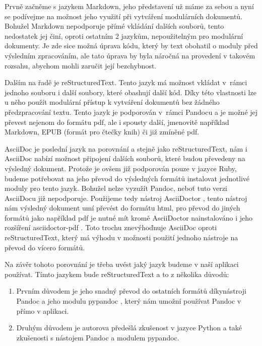 Prvně začněme s jazykem Markdown, jeho představení už máme za sebou a nyní se podívejme na možnost jeho využití při vytváření modulárních dokumentů. Bohužel
Markdown nepodporuje přímé vkládání dalších souborů, tento nedostatek jej činí, oproti ostatním 2 jazykům, nepoužitelným pro modulární dokumenty. Je zde sice možná úprava
kódu, který by text obohatil o moduly před výsledním zpracováním, ale tato úprava by byla náročná na provedení v takovém rozsahu, abychom mohli zaručit její bezchybnost.

Dalším na řadě je reStructuredText. Tento jazyk má možnost vkládat v~rámci jednoho souboru i další soubory, které obashují další kód. Díky této vlastnosti
lze u něho použít modulární přístup k vytváření dokumentů bez žádného předzpracování textu. Tento jazyk je podporován v~rámci Pandocu \cite{pandocSW} a je možné
jej převest nejenom do formátu \gls{pdf}, ale i spousty další, jmenovitě například Markdown, EPUB (formát pro čtečky knih) či již zmíněné \gls{pdf}.

AsciiDoc je poslední jazyk na porovnání a stejně jako reStructuredText, nám i AsciiDoc nabízí možnost připojení dalších souborů, které budou převe\-deny na výsledný dokument.
Protože je ovšem již podporován pouze v jazyce Ruby, budeme potřebovat na jeho převod do výsledných formátů instalovat jednotlivé moduly pro tento jazyk. Bohužel nelze
vyzužít Pandoc, neboť tuto verzi AsciiDocu již nepodporuje. Použijeme tedy nástroj AsciiDoctor \cite{asciiDoctorSW}, tento nástroj nám výsledný dokument umí převést do
formátu \gls{html}, pro převod do jiných formátů jako například \gls{pdf} je nutné mít kromě AsciiDoctor nainstalováno i jeho rozšíření asciidoctor-pdf \cite{asciidoctorpdfSW}.
Toto trochu znevýhoďnuje AsciiDoc oproti reStructuredText, který má výhodu v možnosti použití jednoho nástroje na převod do vícero formátů.

Na závěr tohoto porovnání je třeba uvést jaký jazyk budeme v naší aplikaci používat. Tímto jazykem bude reStructuredText a to z několika důvodů:
\begin{enumerate}
    \item Prvním důvodem je jeho snadný převod do ostatních formátů díky\linebreak nástroji Pandoc \cite{pandocSW} a jeho modulu pypandoc \cite{pypandocSW}, který nám umožní používat Pandoc v přímo v aplikaci.
    \item Druhým důvodem je autorova předešlá zkušenost v jazyce Python a také zkušenosti s nástojem Pandoc a modulem pypandoc.
\end{enumerate}

